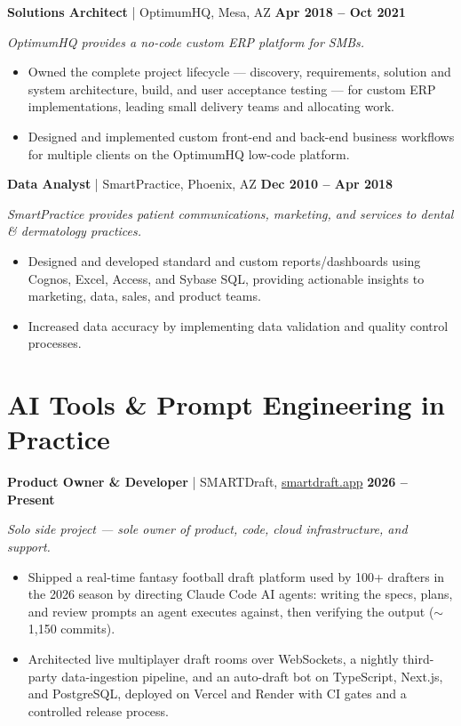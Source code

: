 \documentclass[10pt,letterpaper]{article}
\newcommand{\role}[4]{%
  \vspace{4pt}%
  {\textbf{#2} \textcolor{rulegray}{|} #1 \hfill \textbf{#3}}\par
  {\small\itshape #4\par}}
\newenvironment{roleblock}{\par\begin{minipage}{\textwidth}}{\end{minipage}\par\vspace{7pt}}
\begin{document}
\begin{roleblock}
\role{OptimumHQ, Mesa, AZ}{Solutions Architect}{Apr 2018 -- Oct 2021}
{OptimumHQ provides a no-code custom ERP platform for SMBs.}
\begin{itemize}
  \item Owned the complete project lifecycle — discovery, requirements, solution and system architecture, build, and user acceptance testing — for custom ERP implementations, leading small delivery teams and allocating work.
  \item Designed and implemented custom front-end and back-end business workflows for multiple clients on the OptimumHQ low-code platform.
\end{itemize}
\end{roleblock}

\begin{roleblock}
\role{SmartPractice, Phoenix, AZ}{Data Analyst}{Dec 2010 -- Apr 2018}
{SmartPractice provides patient communications, marketing, and services to dental \& dermatology practices.}
\begin{itemize}
  \item Designed and developed standard and custom reports/dashboards using Cognos, Excel, Access, and Sybase SQL, providing actionable insights to marketing, data, sales, and product teams.
  \item Increased data accuracy by implementing data validation and quality control processes.
\end{itemize}
\end{roleblock}

\section{AI Tools \& Prompt Engineering in Practice}

\begin{roleblock}
\role{SMARTDraft, \href{https://smartdraft.app}{smartdraft.app}}{Product Owner \& Developer}{2026 -- Present}
{Solo side project — sole owner of product, code, cloud infrastructure, and support.}
\begin{itemize}
  \item Shipped a real-time fantasy football draft platform used by 100+ drafters in the 2026 season by directing Claude Code AI agents: writing the specs, plans, and review prompts an agent executes against, then verifying the output ($\sim$1{,}150 commits).
  \item Architected live multiplayer draft rooms over WebSockets, a nightly third-party data-ingestion pipeline, and an auto-draft bot on TypeScript, Next.js, and PostgreSQL, deployed on Vercel and Render with CI gates and a controlled release process.
\end{itemize}
\end{roleblock}
\end{document}
